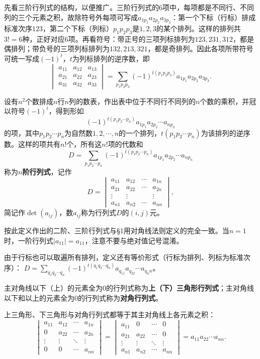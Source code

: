 先看三阶行列式的结构，以便推广。三阶行列式的6项中，每项都是不同行、不同列的三个元素之积，故除符号外每项可写成$a_{1p_1}a_{2p_2}a_{3p_3}$：第一个下标（行标）排成标准次序$123$，第二个下标（列标）$p_1p_2p_3$是$1,2,3$的某个排列。这样的排列共$3!=6$种，正好对应6项。再看符号：带正号的三项列标排列为$123,231,312$，都是偶排列；带负号的三项列标排列为$132,213,321$，都是奇排列。因此各项所带符号可统一写成$(-1)^{t}$，$t$为列标排列的逆序数，即
\[
\begin{vmatrix}
a_{11}&a_{12}&a_{13}\\
a_{21}&a_{22}&a_{23}\\
a_{31}&a_{32}&a_{33}
\end{vmatrix}
=\sum_{p_1p_2p_3}(-1)^{t(p_1p_2p_3)}a_{1p_1}a_{2p_2}a_{3p_3}.
\]

\begin{definition}
设有$n^2$个数排成$n$行$n$列的数表，作出表中位于不同行不同列的$n$个数的乘积，并冠以符号$(-1)^{t}$，得到形如
\[
(-1)^{t(p_1p_2\cdots p_n)}a_{1p_1}a_{2p_2}\cdots a_{np_n}
\]
的项，其中$p_1p_2\cdots p_n$为自然数$1,2,\cdots,n$的一个排列，$t(p_1p_2\cdots p_n)$为该排列的逆序数。这样的项共有$n!$个，所有这$n!$项的代数和
\[
D=\sum_{p_1p_2\cdots p_n}(-1)^{t(p_1p_2\cdots p_n)}a_{1p_1}a_{2p_2}\cdots a_{np_n}
\]
称为\textbf{$n$阶行列式}，记作
\[
D=\begin{vmatrix}
a_{11}&a_{12}&\cdots&a_{1n}\\
a_{21}&a_{22}&\cdots&a_{2n}\\
\vdots&\vdots&&\vdots\\
a_{n1}&a_{n2}&\cdots&a_{nn}
\end{vmatrix},
\]
简记作$\det(a_{ij})$，数$a_{ij}$称为行列式$D$的$(i,j)$元。
\end{definition}

按此定义作出的二阶、三阶行列式与§1用对角线法则定义的完全一致。当$n=1$时，一阶行列式$|a_{11}|=a_{11}$，注意不要与绝对值记号混淆。

由于行标也可以取遍所有排列，定义还有等价形式（行标为排列、列标为标准次序）：
$D=\sum_{q_1q_2\cdots q_n}(-1)^{t(q_1q_2\cdots q_n)}a_{q_11}a_{q_22}\cdots a_{q_nn}$。

\begin{definition}
主对角线以下（上）的元素全为$0$的行列式称为\textbf{上（下）三角形行列式}；主对角线以下和以上的元素全为$0$的行列式称为\textbf{对角行列式}。
\end{definition}

\begin{theorem}
上三角形、下三角形与对角行列式都等于其主对角线上各元素之积：
\[
\begin{vmatrix}
a_{11}&a_{12}&\cdots&a_{1n}\\
0&a_{22}&\cdots&a_{2n}\\
\vdots&\vdots&\ddots&\vdots\\
0&0&\cdots&a_{nn}
\end{vmatrix}
=\begin{vmatrix}
a_{11}&0&\cdots&0\\
a_{21}&a_{22}&\cdots&0\\
\vdots&\vdots&\ddots&\vdots\\
a_{n1}&a_{n2}&\cdots&a_{nn}
\end{vmatrix}
=a_{11}a_{22}\cdots a_{nn}.
\]
\end{theorem}

